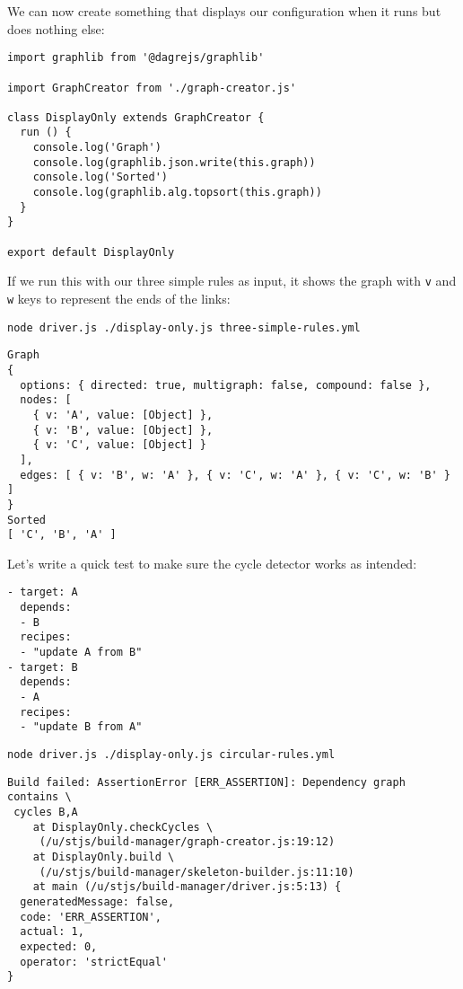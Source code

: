 \documentclass[krantzl]{krantz}
\begin{document}
We can now create something that displays our configuration when it runs
but does nothing else:


\begin{lstlisting}[frame=tblr]
import graphlib from '@dagrejs/graphlib'

import GraphCreator from './graph-creator.js'

class DisplayOnly extends GraphCreator {
  run () {
    console.log('Graph')
    console.log(graphlib.json.write(this.graph))
    console.log('Sorted')
    console.log(graphlib.alg.topsort(this.graph))
  }
}

export default DisplayOnly
\end{lstlisting}



If we run this with our three simple rules as input,
it shows the graph with \texttt{v} and \texttt{w} keys to represent the ends of the links:


\begin{lstlisting}[frame=shadowbox]
node driver.js ./display-only.js three-simple-rules.yml
\end{lstlisting}



\begin{lstlisting}[frame=tblr,backgroundcolor=\color{black!5}]
Graph
{
  options: { directed: true, multigraph: false, compound: false },
  nodes: [
    { v: 'A', value: [Object] },
    { v: 'B', value: [Object] },
    { v: 'C', value: [Object] }
  ],
  edges: [ { v: 'B', w: 'A' }, { v: 'C', w: 'A' }, { v: 'C', w: 'B' } ]
}
Sorted
[ 'C', 'B', 'A' ]
\end{lstlisting}



Let’s write a quick test to make sure the cycle detector works as intended:


\begin{lstlisting}[frame=tblr]
- target: A
  depends:
  - B
  recipes:
  - "update A from B"
- target: B
  depends:
  - A
  recipes:
  - "update B from A"
\end{lstlisting}



\begin{lstlisting}[frame=shadowbox]
node driver.js ./display-only.js circular-rules.yml
\end{lstlisting}



\begin{lstlisting}[frame=tblr,backgroundcolor=\color{black!5}]
Build failed: AssertionError [ERR_ASSERTION]: Dependency graph contains \
 cycles B,A
    at DisplayOnly.checkCycles \
     (/u/stjs/build-manager/graph-creator.js:19:12)
    at DisplayOnly.build \
     (/u/stjs/build-manager/skeleton-builder.js:11:10)
    at main (/u/stjs/build-manager/driver.js:5:13) {
  generatedMessage: false,
  code: 'ERR_ASSERTION',
  actual: 1,
  expected: 0,
  operator: 'strictEqual'
}
\end{lstlisting}
\end{document}
